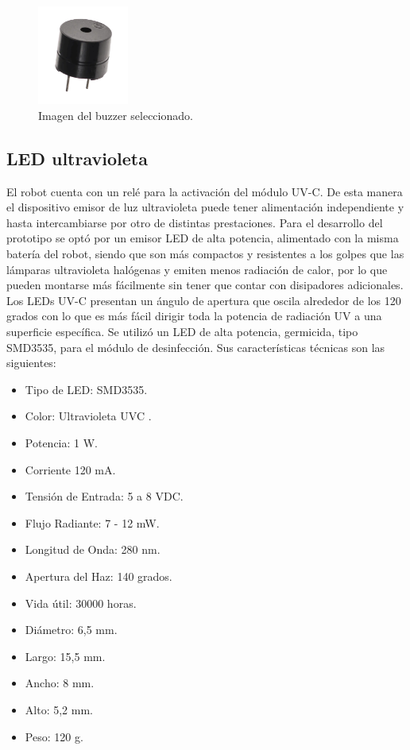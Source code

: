 \begin{figure}[h]
	\centering
	\includegraphics[width=3cm]{./Figures/buzzer2.PNG}
	\caption{Imagen del buzzer seleccionado\protect\footnotemark.}
	\label{fig:buzzer2}
\end{figure}

\subsection{LED ultravioleta }

El robot cuenta con un relé para la activación del módulo UV-C. De esta manera el dispositivo emisor de luz ultravioleta puede tener alimentación independiente y hasta intercambiarse por otro de distintas prestaciones.
Para el desarrollo del prototipo se optó por un emisor LED de alta potencia, alimentado con la misma batería del robot, siendo que   son más compactos y resistentes a los golpes que las lámparas ultravioleta halógenas y emiten menos radiación de calor, por lo que pueden montarse más fácilmente sin tener que contar con disipadores adicionales. 
Los LEDs UV-C presentan un ángulo de apertura que oscila alrededor de los 120 grados con lo que es más fácil dirigir toda la potencia de radiación UV a una superficie específica.
Se utilizó un LED de alta potencia, germicida, tipo SMD3535, para el módulo de desinfección. Sus características técnicas son las siguientes:

\begin{itemize}
	\item Tipo de LED:		SMD3535.
	\item Color:		Ultravioleta UVC .
	\item Potencia:		1 W.
	\item Corriente		120 mA.	
	\item Tensión de Entrada:	5 a 8 VDC.
	\item Flujo Radiante:	7 - 12 mW.
	\item Longitud de Onda:	280 nm.
	\item Apertura del Haz:	140 grados.	
	\item Vida útil:	30000 horas.	
	\item Diámetro:		6,5 mm.	
	\item Largo:		15,5 mm.	
	\item Ancho:		8 mm.		
	\item Alto:			5,2 mm.		
	\item Peso: 		120 g.		
\end{itemize}



